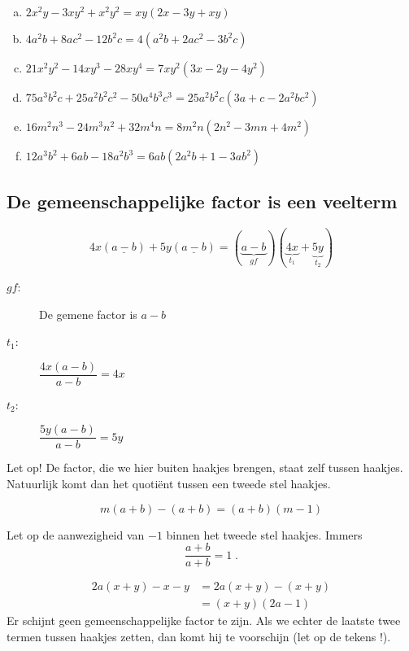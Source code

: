 \documentclass[12pt]{article}
\begin{document}
\begin{solution}
\vspace{-2\topsep}
\begin{enumerate}[(a)]
  \item $2x^2y - 3xy^2 + x^2y^2=xy (2x - 3y + xy)$
  \item $4a^2b + 8ac^2 - 12b^2c=4 (a^2b + 2ac^2 - 3b^2c)$
  \item $21x^2y^2 - 14xy^3 - 28xy^4=7xy^2 (3x - 2y - 4y^2)$
  \item $75a^3b^2c + 25a^2b^2c^2 - 50a^4b^3c^3=25a^2b^2c (3a + c - 2a^2bc^2)$
  \item $16m^2n^3 - 24m^3n^2 + 32m^4n=8m^2n (2n^2 - 3mn + 4m^2)$
  \item $12a^3b^2 + 6ab - 18a^2b^3=6ab (2a^2b + 1 - 3ab^2)$
\end{enumerate}
\end{solution}

\subsection{De gemeenschappelijke factor is een veelterm}

\begin{voorbeeld}
$$4x (\underline{a - b}) + 5y (\underline{a - b}) = (\underbrace{a - b}_{gf}) (\underbrace{4x}_{t_1} + \underbrace{5y}_{t_2})$$

\begin{description}
  \item[$gf$:] De gemene factor is $a-b$
  \item[$t_1$:] $\dfrac{4x(a-b)}{a-b}=4x$
  \item[$t_2$:] $\dfrac{5y(a-b)}{a-b}=5y$
\end{description}

Let op! De factor, die we hier buiten haakjes brengen, staat zelf tussen haakjes. Natuurlijk komt dan het quotiënt tussen een tweede stel haakjes.
\end{voorbeeld}

\begin{voorbeeld}
$$m (a + b) - (a + b) = (a + b) (m - 1)$$

Let op de aanwezigheid van $-1$ binnen het tweede stel haakjes. Immers
$$\dfrac{a+b}{a+b}=1\;.$$
\end{voorbeeld}

\begin{voorbeeld}
\begin{align*}
  2a (x + y) - x - y &= 2a (x + y) - (x + y)\\
                     &= (x + y) (2a - 1)
\end{align*}
Er schijnt geen gemeenschappelijke factor te zijn. Als we echter de laatste twee termen tussen haakjes zetten, dan komt hij te voorschijn (let op de tekens !).
\end{voorbeeld}
\end{document}
